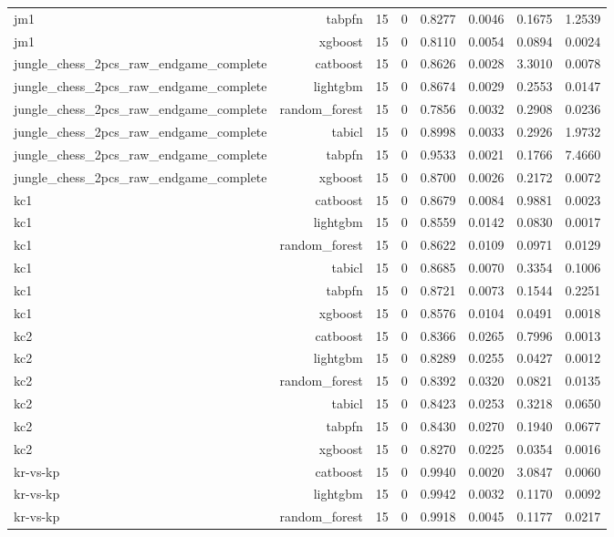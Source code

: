 \begin{table}[htbp]
\begin{tabular}{lrrrrrrr}
jm1 & tabpfn & 15 & 0 & 0.8277 & 0.0046 & 0.1675 & 1.2539 \\
jm1 & xgboost & 15 & 0 & 0.8110 & 0.0054 & 0.0894 & 0.0024 \\
jungle\_chess\_2pcs\_raw\_endgame\_complete & catboost & 15 & 0 & 0.8626 & 0.0028 & 3.3010 & 0.0078 \\
jungle\_chess\_2pcs\_raw\_endgame\_complete & lightgbm & 15 & 0 & 0.8674 & 0.0029 & 0.2553 & 0.0147 \\
jungle\_chess\_2pcs\_raw\_endgame\_complete & random\_forest & 15 & 0 & 0.7856 & 0.0032 & 0.2908 & 0.0236 \\
jungle\_chess\_2pcs\_raw\_endgame\_complete & tabicl & 15 & 0 & 0.8998 & 0.0033 & 0.2926 & 1.9732 \\
jungle\_chess\_2pcs\_raw\_endgame\_complete & tabpfn & 15 & 0 & 0.9533 & 0.0021 & 0.1766 & 7.4660 \\
jungle\_chess\_2pcs\_raw\_endgame\_complete & xgboost & 15 & 0 & 0.8700 & 0.0026 & 0.2172 & 0.0072 \\
kc1 & catboost & 15 & 0 & 0.8679 & 0.0084 & 0.9881 & 0.0023 \\
kc1 & lightgbm & 15 & 0 & 0.8559 & 0.0142 & 0.0830 & 0.0017 \\
kc1 & random\_forest & 15 & 0 & 0.8622 & 0.0109 & 0.0971 & 0.0129 \\
kc1 & tabicl & 15 & 0 & 0.8685 & 0.0070 & 0.3354 & 0.1006 \\
kc1 & tabpfn & 15 & 0 & 0.8721 & 0.0073 & 0.1544 & 0.2251 \\
kc1 & xgboost & 15 & 0 & 0.8576 & 0.0104 & 0.0491 & 0.0018 \\
kc2 & catboost & 15 & 0 & 0.8366 & 0.0265 & 0.7996 & 0.0013 \\
kc2 & lightgbm & 15 & 0 & 0.8289 & 0.0255 & 0.0427 & 0.0012 \\
kc2 & random\_forest & 15 & 0 & 0.8392 & 0.0320 & 0.0821 & 0.0135 \\
kc2 & tabicl & 15 & 0 & 0.8423 & 0.0253 & 0.3218 & 0.0650 \\
kc2 & tabpfn & 15 & 0 & 0.8430 & 0.0270 & 0.1940 & 0.0677 \\
kc2 & xgboost & 15 & 0 & 0.8270 & 0.0225 & 0.0354 & 0.0016 \\
kr-vs-kp & catboost & 15 & 0 & 0.9940 & 0.0020 & 3.0847 & 0.0060 \\
kr-vs-kp & lightgbm & 15 & 0 & 0.9942 & 0.0032 & 0.1170 & 0.0092 \\
kr-vs-kp & random\_forest & 15 & 0 & 0.9918 & 0.0045 & 0.1177 & 0.0217 \\

\end{tabular}
\end{table}
